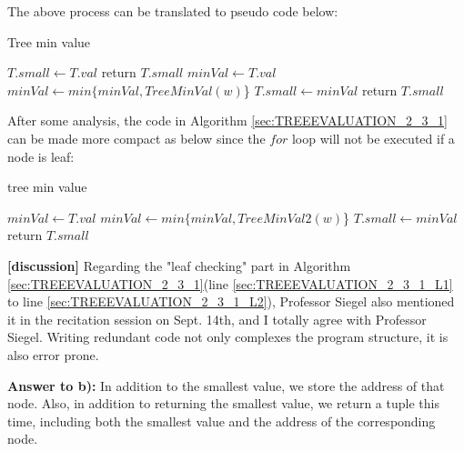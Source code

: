 \documentclass[a4paper,11pt]{article}
\theoremstyle{mytheor}
\begin{document}
The above process can be translated to pseudo code below:

\begin{algorithm}[H]
\caption{Tree min value}\label{sec:TREEEVALUATION_2_3_1}
\begin{algorithmic}[1]
   \label{sec:TREEEVALUATION_2_3_1_L1}
    \State $T.small \gets T.val$
    \State return $T.small$ \label{sec:TREEEVALUATION_2_3_1_L2}
  \Else
    \State $minVal \gets T.val$
      \State $minVal \gets min\{minVal, TreeMinVal(w)$\} 
    \EndFor
    \State $T.small \gets minVal$
    \State return $T.small$
  \EndIf
\EndFunction
\end{algorithmic}
\end{algorithm}

After some analysis, the code in Algorithm \ref{sec:TREEEVALUATION_2_3_1} can be made more compact as below since the $for$ loop will not be executed if a node is leaf:

\begin{algorithm}[H]
\caption{tree min value}\label{sec:TREEEVALUATION_2_3_2}
\begin{algorithmic}[1]
  \State $minVal \gets T.val$
    \State $minVal \gets min\{minVal, TreeMinVal2(w)$\} 
  \EndFor
  \State $T.small \gets minVal$
  \State return $T.small$
\EndFunction
\end{algorithmic}
\end{algorithm}
\textbf{[discussion]} Regarding the "leaf checking" part in Algorithm \ref{sec:TREEEVALUATION_2_3_1}(line \ref{sec:TREEEVALUATION_2_3_1_L1} to line \ref{sec:TREEEVALUATION_2_3_1_L2}), Professor Siegel also mentioned it in the recitation session on Sept. 14th, and I totally agree with Professor Siegel. Writing redundant code not only complexes the program structure, it is also error prone.

\vspace{1.2in}


\noindent\textbf{Answer to b):} In addition to the smallest value, we store the address of that node. Also, in addition to returning the smallest value, we return a tuple this time, including both the smallest value and the address of the corresponding node.
\end{document}

